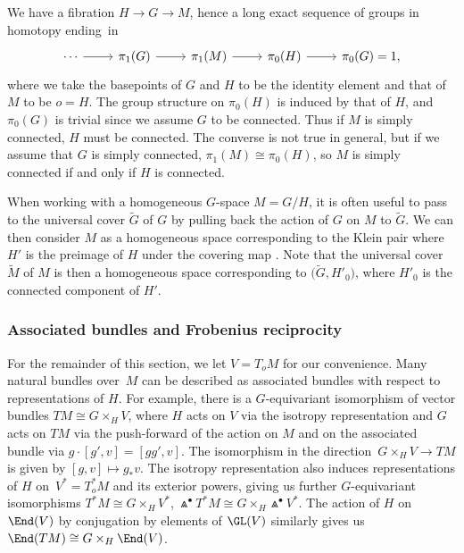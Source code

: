 We have a fibration $H\to G\to M$, hence a long exact sequence of groups in homotopy ending~in
\[
\begin{tikzcd}
	\cdots \ar[r] &\pi_1(G) \ar[r] &\pi_1(M) \ar[r] &\pi_0(H) \ar[r] &\pi_0(G)=1,
\end{tikzcd}
\]
where we take the basepoints of $G$ and $H$ to be the identity element and that of $M$ to be $o=H$. The group structure on $\pi_0(H)$ is induced by that of $H$, and $\pi_0(G)$ is trivial since we assume $G$ to be connected. Thus if $M$ is simply connected, $H$ must be connected. The converse is not true in general, but if we assume that $G$ is simply connected, $\pi_1(M)\cong\pi_0(H)$, so $M$ is simply connected if and only if $H$ is connected.

When working with a homogeneous $G$-space $M=G/H$, it is often useful to pass to the universal cover $\widetilde{G}$ of $G$ by pulling back the action of $G$ on $M$ to $\widetilde{G}$. We can then consider $M$ as a homogeneous space corresponding to the Klein pair  where $H'$ is the preimage of $H$ under the covering map . Note that the universal cover $\widetilde{M}$ of $M$ is then a homogeneous space corresponding to $\bigl(\widetilde{G},H'_0\bigr)$, where $H'_0$ is the connected component of $H'$.

\subsubsection{Associated bundles and Frobenius reciprocity}

For the remainder of this section, we let $V=T_o M$ for our convenience. Many natural bundles over~$M$ can be described as associated bundles with respect to representations of $H$. For example, there is a $G$-equivariant isomorphism of vector bundles
$
	TM \cong G\times_H V$,
where $H$ acts on $V$ via the isotropy representation and $G$ acts on $TM$ via the push-forward of the action on $M$ and on the associated bundle via $g\cdot[g',v]=[gg',v]$. The isomorphism in the direction~${G\times_H V\to TM}$ is given by $[g,v]\mapsto g_* v$. The isotropy representation also induces representations of $H$ on~${V^*=T^*_o M}$ and its exterior powers, giving us further $G$-equivariant isomorphisms
$T^*M \cong G\times_H V^*$,	$
	\Wedge^\bullet T^*M \cong G\times_H \Wedge^\bullet V^*$.
The action of $H$ on $\End(V)$ by conjugation by elements of $\GL(V)$ similarly gives us
$\End(TM) \cong G\times_H \End(V)$.

